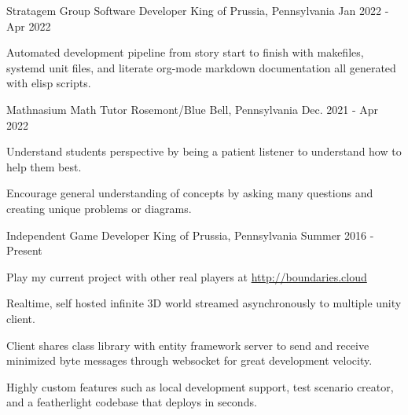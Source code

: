 

\begin{cventries}

  \cventry
    {Stratagem Group} %
    {Software Developer} %
    {King of Prussia, Pennsylvania} %
    {Jan 2022 - Apr 2022} %
    {
      \begin{cvitems} %
        \item {Automated development pipeline from story start to finish
               with makefiles, systemd unit files, and literate org-mode markdown documentation
               all generated with elisp scripts.}
      \end{cvitems}
    }

  \cventry
    {Mathnasium} %
    {Math Tutor} %
    {Rosemont/Blue Bell, Pennsylvania} %
    {Dec. 2021 - Apr 2022} %
    {
      \begin{cvitems} %
        \item {Understand students perspective by being a patient listener to understand how to help them best.}
        \item {Encourage general understanding of concepts by asking many questions and creating unique problems or diagrams.}
      \end{cvitems}
    }

  \cventry
    {Independent} %
    {Game Developer} %
    {King of Prussia, Pennsylvania} %
    {Summer 2016 - Present} %
    {
      \begin{cvitems} %
        \item {Play my current project with other real players at \url{http://boundaries.cloud}}
        \item {Realtime, self hosted infinite 3D world streamed asynchronously to multiple unity client.}
        \item {Client shares class library with entity framework server to send and receive minimized byte messages through websocket for great development velocity.}
        \item {Highly custom features such as local development support, test scenario creator, and a featherlight codebase that deploys in seconds.}
      \end{cvitems}
    }


\end{cventries}
